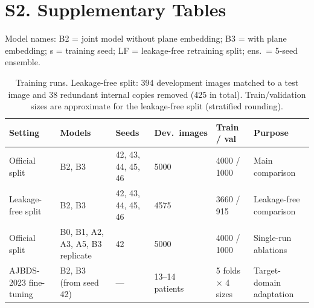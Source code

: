 \section*{S2. Supplementary Tables}
Model names: B2 = joint model without plane embedding; B3 = with plane embedding; s = training seed; LF = leakage-free retraining split; ens.\ = 5-seed ensemble.

\begin{table}[!ht]
\centering
\scriptsize
\caption{Training runs. Leakage-free split: 394 development images matched to a test image and 38 redundant internal copies removed (425 in total). Train/validation sizes are approximate for the leakage-free split (stratified rounding).}
\label{tab:s-runs}
\begin{tabular}{llllll}
\toprule
Setting & Models & Seeds & Dev.\ images & Train / val & Purpose \\
\midrule
Official split & B2, B3 & 42, 43, 44, 45, 46 & 5000 & 4000 / 1000 & Main comparison \\
Leakage-free split & B2, B3 & 42, 43, 44, 45, 46 & 4575 & 3660 / 915 & Leakage-free comparison \\
Official split & B0, B1, A2, A3, A5, B3 replicate & 42 & 5000 & 4000 / 1000 & Single-run ablations \\
AJBDS-2023 fine-tuning & B2, B3 (from seed 42) & --- & 13--14 patients & 5 folds $\times$ 4 sizes & Target-domain adaptation \\
\bottomrule
\end{tabular}
\end{table}

